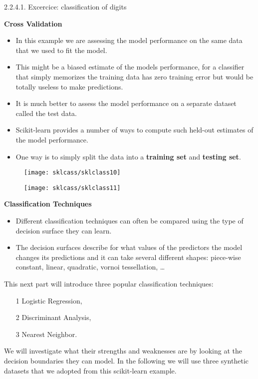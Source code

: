 2.2.4.1. Excercice: classification of digits\documentclass[MASTER.tex]{subfiles}
\begin{document}
	\large
	\textbf{Cross Validation}
\begin{itemize}
\item In this example we are assessing the model performance on the same data that we used to fit the model. 
\item This might be a biased estimate of the models performance, for a classifier that simply memorizes the training data has zero training error but would be totally useless to make predictions.
\item  It is much better to assess the model performance on a separate dataset called the test data.
\item  Scikit-learn provides a number of ways to compute such held-out estimates of the model performance. \item One way is to simply split the data into a \textbf{training set} and \textbf{testing set}.
\end{itemize}



\begin{figure}
\centering
\texttt{[image: sklcass/sklclass10]}

\end{figure}



\begin{figure}
\centering
\texttt{[image: sklcass/sklclass11]}

\end{figure}



\Large
\textbf{Classification Techniques}
\begin{itemize}
\item Different classification techniques can often be compared using the type of decision surface they can learn. \item The decision surfaces describe for what values of the predictors the model changes its predictions and it can take several different shapes: piece-wise constant, linear, quadratic, vornoi tessellation, \ldots
\end{itemize}



\Large
This next part will introduce three popular classification techniques: 
\begin{itemize}
\item[1] Logistic Regression, 
\item[2] Discriminant Analysis, 
\item[3] Nearest Neighbor.
\end{itemize} We will investigate what their strengths and weaknesses are by looking at the decision boundaries they can model. In the following we will use three synthetic datasets that we adopted from this scikit-learn example.
\end{document}
